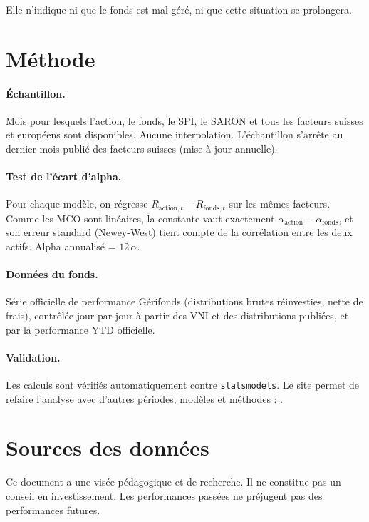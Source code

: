 \documentclass[11pt,a4paper]{article}
\begin{document}
\FinalePhrase{} Elle n'indique ni que le fonds est mal géré, ni que cette situation se prolongera.

\appendix
\section{Méthode}

\paragraph{Échantillon.} Mois pour lesquels l'action, le fonds, le SPI, le SARON et tous les facteurs suisses et européens sont disponibles. Aucune interpolation. L'échantillon s'arrête au dernier mois publié des facteurs suisses (mise à jour annuelle).

\paragraph{Test de l'écart d'alpha.} Pour chaque modèle, on régresse $R_{\text{action},t} - R_{\text{fonds},t}$ sur les mêmes facteurs. Comme les MCO sont linéaires, la constante vaut exactement $\alpha_{\text{action}} - \alpha_{\text{fonds}}$, et son erreur standard (Newey-West) tient compte de la corrélation entre les deux actifs. Alpha annualisé = $12\,\alpha$.

\paragraph{Données du fonds.} Série officielle de performance Gérifonds (distributions brutes réinvesties, nette de frais), contrôlée jour par jour à partir des VNI et des distributions publiées, et par la performance YTD officielle.

\paragraph{Validation.} Les calculs sont vérifiés automatiquement contre \texttt{statsmodels}. Le site permet de refaire l'analyse avec d'autres périodes, modèles et méthodes : \URLSite.

\section{Sources des données}

\begin{center}\small

\end{center}

\vfill
{\small\color{gris} Ce document a une visée pédagogique et de recherche. Il ne constitue pas un conseil en investissement. Les performances passées ne préjugent pas des performances futures.}
\end{document}
